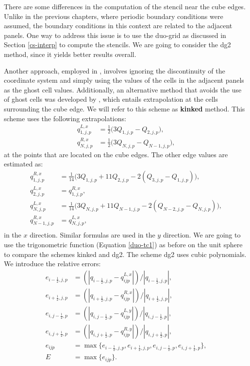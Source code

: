 There are  some differences in the computation of the stencil near the cube edges.
Unlike in the previous chapters, where periodic boundary conditions were assumed, 
the boundary conditions in this context are related to the adjacent panels. 
One way to address this issue is to use the duo-grid as discussed  in Section \ref{cs-interp} to compute the stencils. 
We are going to consider the dg2 method, since it yields better results overall.

Another approach, employed in \citet{sadourny:1972}, involves ignoring the
discontinuity of the coordinate system and simply using the values of the cells 
in the adjacent panels as the ghost cell values. 
Additionally, an alternative method that avoids the use of ghost cells was developed by
\citet{putman:2007}, which entails extrapolation at the cells surrounding the cube edge.
We will refer to this scheme as \textbf{kinked} method.
This scheme uses the following extrapolations:
\begin{align*}
	q^{L,x}_{1,j,p} &= \frac{1}{2}\bigg(3Q_{1,j,p} - Q_{2,j,p}\bigg),\\
	q^{R,x}_{N,j,p} &= \frac{1}{2}\bigg(3Q_{N,j,p} - Q_{N-1,j,p}\bigg),
\end{align*}
at the points that are located on the cube edges. The other edge values are estimated as:
\begin{align*}
	q^{R,x}_{1,j,p} &= \frac{1}{14}\bigg(3Q_{1,j,p} + 11Q_{2,j,p} - 2(Q_{3,j,p} - Q_{1,j,p})\bigg),\\
	q^{L,x}_{2,j,p} &= q^{R,x}_{1,j,p},\\
	q^{L,x}_{N,j,p} &= \frac{1}{14}\bigg(3Q_{N,j,p} + 11Q_{N-1,j,p} - 2(Q_{N-2,j,p} - Q_{N,j,p})\bigg),\\
	q^{R,x}_{N-1,j,p} &= q^{L,x}_{N,j,p},\\
\end{align*}
in the $x$ direction. Similar formulas are used in the $y$ direction.
We are going to use the trigonometric function (Equation \eqref{duo-tc1})
as before on the unit sphere to compare the schemes kinked and dg2. The scheme dg2 uses cubic polynomials.
We introduce the relative errors:
\begin{align*}
	e_{{i-\frac{1}{2}},j,p} &= (|q_{{i-\frac{1}{2}},j,p} - q^{L,x}_{ijp}|)/|q_{{i-\frac{1}{2}},j,p}|,\\
	e_{{i+\frac{1}{2}},j,p} &= (|q_{{i+\frac{1}{2}},j,p} - q^{R,x}_{ijp}|)/|q_{{i+\frac{1}{2}},j,p}|,\\
	e_{i,{j-\frac{1}{2}},p} &= (|q_{i,{j-\frac{1}{2}},p} - q^{L,y}_{ijp}|)/|q_{i,{j-\frac{1}{2}},p}|,\\
	e_{i,{j+\frac{1}{2}},p} &= (|q_{i,{j+\frac{1}{2}},p} - q^{R,y}_{ijp}|)/|q_{i,{j+\frac{1}{2}},p}|,\\
	e_{ijp} &= \max\{e_{{i-\frac{1}{2}},j,p}, e_{{i+\frac{1}{2}},j,p} , e_{i,{j-\frac{1}{2}},p}, e_{i,{j+\frac{1}{2}},p} \},\\
	E &= \max \{e_{ijp}\}.
\end{align*}
